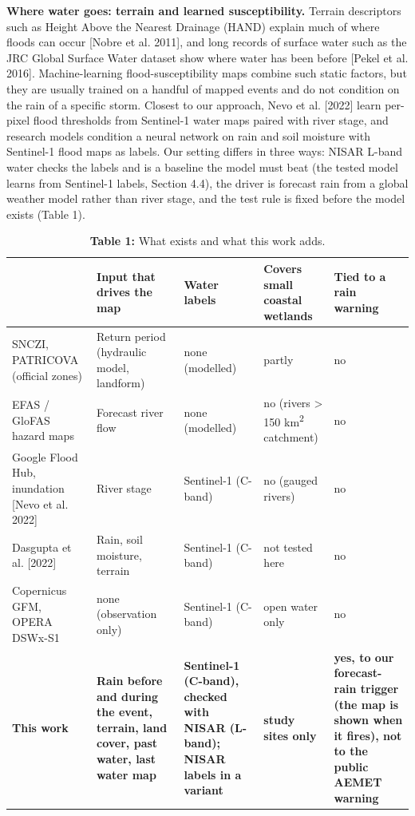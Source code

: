 \documentclass[10pt,twocolumn]{article}
\begin{document}
\textbf{Where water goes: terrain and learned susceptibility.} Terrain descriptors such as Height Above the Nearest Drainage (HAND) explain much of where floods can occur [Nobre et al. 2011], and long records of surface water such as the JRC Global Surface Water dataset show where water has been before [Pekel et al. 2016]. Machine-learning flood-susceptibility maps combine such static factors, but they are usually trained on a handful of mapped events and do not condition on the rain of a specific storm. Closest to our approach, Nevo et al. [2022] learn per-pixel flood thresholds from Sentinel-1 water maps paired with river stage, and research models condition a neural network on rain and soil moisture with Sentinel-1 flood maps as labels. Our setting differs in three ways: NISAR L-band water checks the labels and is a baseline the model must beat (the tested model learns from Sentinel-1 labels, Section 4.4), the driver is forecast rain from a global weather model rather than river stage, and the test rule is fixed before the model exists (Table 1).

\begin{table}[tbp]
\centering
\caption{\textbf{Table 1:} What exists and what this work adds.}
\footnotesize
\begin{tabularx}{\textwidth}{LLLLL}
\toprule
\textbf{} & \textbf{Input that drives the map} & \textbf{Water labels} & \textbf{Covers small coastal wetlands} & \textbf{Tied to a rain warning} \\
\midrule
{}SNCZI, PATRICOVA (official zones) & Return period (hydraulic model, landform) & none (modelled) & partly & no \\
{}EFAS / GloFAS hazard maps & Forecast river flow & none (modelled) & no (rivers > 150 km\textsuperscript{2} catchment) & no \\
{}Google Flood Hub, inundation [Nevo et al. 2022] & River stage & Sentinel-1 (C-band) & no (gauged rivers) & no \\
{}Dasgupta et al. [2022] & Rain, soil moisture, terrain & Sentinel-1 (C-band) & not tested here & no \\
{}Copernicus GFM, OPERA DSWx-S1 & none (observation only) & Sentinel-1 (C-band) & open water only & no \\
{}\textbf{This work} & \textbf{Rain before and during the event, terrain, land cover, past water, last water map} & \textbf{Sentinel-1 (C-band), checked with NISAR (L-band); NISAR labels in a variant} & \textbf{study sites only} & \textbf{yes, to our forecast-rain trigger (the map is shown when it fires), not to the public AEMET warning} \\
\bottomrule
\end{tabularx}
\end{table}
\end{document}
